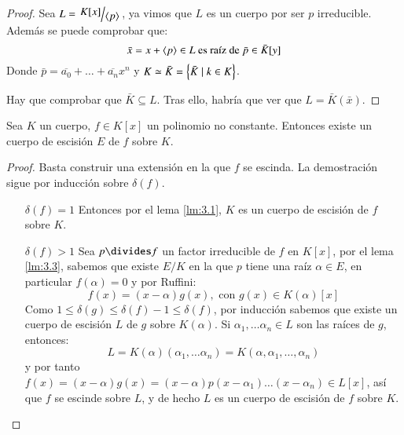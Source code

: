 \begin{proof}
    Sea $L = \quo{K[x]}{\gen{p}}$, ya vimos que $L$ es un cuerpo por ser $p$ irreducible. Además se puede comprobar que:
    $$
        \bar x = x + \langle p\rangle \in L \text{ es raíz de } \bar p \in \bar K[y]
    $$
    Donde $\bar p = \overline{a_0} + \ldots + \overline{a_n}x^n$ y $K \simeq \bar K = \left\{\bar K \mid k \in K\right\}$.

    Hay que comprobar que $\bar K \subseteq L$. Tras ello, habría que ver que $L = \bar K(\bar x)$.
\end{proof}

\begin{thm}\label{thm:3.4}
    Sea $K$ un cuerpo, $f \in K[x]$ un polinomio no constante. Entonces existe un cuerpo de escisión $E$ de $f$ sobre $K$.
\end{thm}

\begin{proof}
    Basta construir una extensión en la que $f$ se escinda. La demostración sigue por inducción sobre $\delta(f)$.
    \begin{itemize}
        \item[$\delta(f) = 1$] Entonces por el lema \ref{lm:3.1}, $K$ es un cuerpo de escisión de $f$ sobre $K$.
        \item[$\delta(f)>1$] Sea $p \divides f$ un factor irreducible de $f$ en $K[x]$, por el lema \ref{lm:3.3}, sabemos que existe $E/K$ en la que $p$ tiene una raíz $\alpha \in E$, en particular $f(\alpha) = 0$ y por Ruffini:
        $$
            f(x) = (x - \alpha) g(x),\text{ con } g(x) \in K(\alpha)[x]
        $$
        Como $1 \leq \delta(g) \leq \delta(f) - 1 \leq \delta(f)$, por inducción sabemos que existe un cuerpo de escisión $L$ de $g$ sobre $K(\alpha)$. Si $\alpha_1, \ldots \alpha_n \in L$ son las raíces de $g$, entonces:
        $$
            L = K(\alpha)(\alpha_1, \ldots \alpha_n) = K(\alpha, \alpha_1, \ldots, \alpha_n)
        $$
        y por tanto $f(x) = (x - \alpha) g(x) = (x - \alpha) p (x - \alpha_1) \ldots (x - \alpha_n) \in L[x]$, así que $f$ se escinde sobre $L$, y de hecho $L$ es un cuerpo de escisión de $f$ sobre $K$.
    \end{itemize}
\end{proof}

